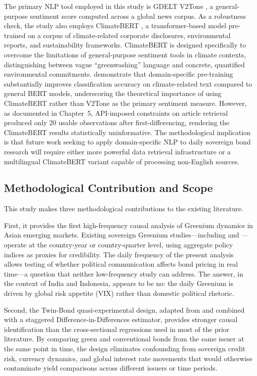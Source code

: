 \documentclass[12pt,a4paper]{article}
\begin{document}
The primary NLP tool employed in this study is GDELT V2Tone \citep{Leetaru2013}, a general-purpose sentiment score computed across a global news corpus. As a robustness check, the study also employs ClimateBERT \citep{Webersinke2022}, a transformer-based model pre-trained on a corpus of climate-related corporate disclosures, environmental reports, and sustainability frameworks. ClimateBERT is designed specifically to overcome the limitations of general-purpose sentiment tools in climate contexts, distinguishing between vague ``greenwashing'' language and concrete, quantified environmental commitments. \citet{Webersinke2022} demonstrate that domain-specific pre-training substantially improves classification accuracy on climate-related text compared to general BERT models, underscoring the theoretical importance of using ClimateBERT rather than V2Tone as the primary sentiment measure. However, as documented in Chapter~5, API-imposed constraints on article retrieval produced only 20 usable observations after first-differencing, rendering the ClimateBERT results statistically uninformative. The methodological implication is that future work seeking to apply domain-specific NLP to daily sovereign bond research will require either more powerful data retrieval infrastructure or a multilingual ClimateBERT variant capable of processing non-English sources.


\subsection{Methodological Contribution and Scope}

This study makes three methodological contributions to the existing literature.

First, it provides the first high-frequency causal analysis of Greenium dynamics in Asian emerging markets. Existing sovereign Greenium studies---including \citet{Panizza2025} and \citet{Lau2024}---operate at the country-year or country-quarter level, using aggregate policy indices as proxies for credibility. The daily frequency of the present analysis allows testing of whether political communication affects bond pricing in real time---a question that neither low-frequency study can address. The answer, in the context of India and Indonesia, appears to be no: the daily Greenium is driven by global risk appetite (VIX) rather than domestic political rhetoric.

Second, the Twin-Bond quasi-experimental design, adapted from \citet{Zerbib2019} and combined with a staggered Difference-in-Differences estimator, provides stronger causal identification than the cross-sectional regressions used in most of the prior literature. By comparing green and conventional bonds from the same issuer at the same point in time, the design eliminates confounding from sovereign credit risk, currency dynamics, and global interest rate movements that would otherwise contaminate yield comparisons across different issuers or time periods.
\end{document}
